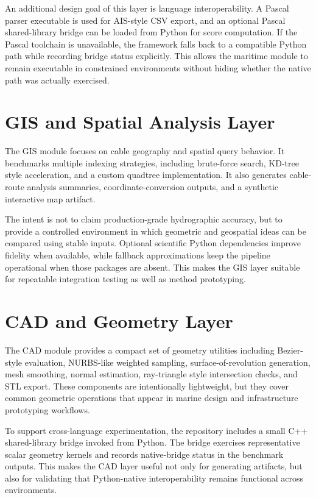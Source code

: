 \documentclass[conference]{IEEEtran}
\begin{document}
An additional design goal of this layer is language interoperability. A Pascal parser executable is used for AIS-style CSV export, and an optional Pascal shared-library bridge can be loaded from Python for score computation. If the Pascal toolchain is unavailable, the framework falls back to a compatible Python path while recording bridge status explicitly. This allows the maritime module to remain executable in constrained environments without hiding whether the native path was actually exercised.

\section{GIS and Spatial Analysis Layer}
The GIS module focuses on cable geography and spatial query behavior. It benchmarks multiple indexing strategies, including brute-force search, KD-tree style acceleration, and a custom quadtree implementation. It also generates cable-route analysis summaries, coordinate-conversion outputs, and a synthetic interactive map artifact.

The intent is not to claim production-grade hydrographic accuracy, but to provide a controlled environment in which geometric and geospatial ideas can be compared using stable inputs. Optional scientific Python dependencies improve fidelity when available, while fallback approximations keep the pipeline operational when those packages are absent. This makes the GIS layer suitable for repeatable integration testing as well as method prototyping.

\section{CAD and Geometry Layer}
The CAD module provides a compact set of geometry utilities including Bezier-style evaluation, NURBS-like weighted sampling, surface-of-revolution generation, mesh smoothing, normal estimation, ray-triangle style intersection checks, and STL export. These components are intentionally lightweight, but they cover common geometric operations that appear in marine design and infrastructure prototyping workflows.

To support cross-language experimentation, the repository includes a small C++ shared-library bridge invoked from Python. The bridge exercises representative scalar geometry kernels and records native-bridge status in the benchmark outputs. This makes the CAD layer useful not only for generating artifacts, but also for validating that Python-native interoperability remains functional across environments.
\end{document}
